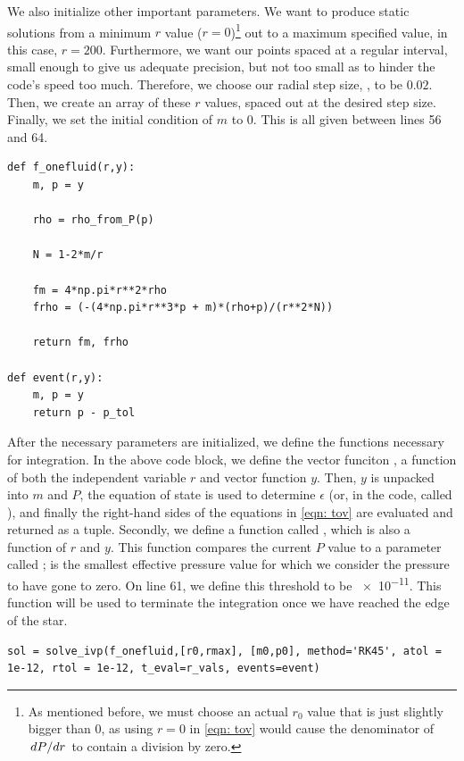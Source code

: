 We also initialize other important parameters. We want to produce static solutions from a minimum $r$ value ($r=0$)\footnote{As mentioned before, we must choose an actual $r_0$ value that is just slightly bigger than 0, as using $r=0$ in \eqref{eqn: tov} would cause the denominator of $\dv*{P}{r}$ to contain a division by zero.} out to a maximum specified value, in this case, $r=200$. Furthermore, we want our points spaced at a regular interval, small enough to give us adequate precision, but not too small as to hinder the code's speed too much. Therefore, we choose our radial step size, , to be $0.02$. Then, we create an array of these $r$ values, spaced out at the desired step size. Finally, we set the initial condition of $m$ to 0. This is all given between lines 56 and 64.

\begin{lstlisting}
def f_onefluid(r,y):
    m, p = y

    rho = rho_from_P(p)

    N = 1-2*m/r

    fm = 4*np.pi*r**2*rho
    frho = (-(4*np.pi*r**3*p + m)*(rho+p)/(r**2*N))

    return fm, frho

def event(r,y):
    m, p = y
    return p - p_tol
\end{lstlisting}

After the necessary parameters are initialized, we define the functions necessary for integration. In the above code block, we define the vector funciton , a function of both the independent variable $r$ and vector function $y$. Then, $y$ is unpacked into $m$ and $P$, the equation of state is used to determine $\epsilon$ (or, in the code, called ), and finally the right-hand sides of the equations in \eqref{eqn: tov} are evaluated and returned as a tuple. Secondly, we define a function called , which is also a function of $r$ and $y$. This function compares the current $P$ value to a parameter called ;  is the smallest effective pressure value for which we consider the pressure to have gone to zero. On line 61, we define this threshold to be \SI{e-11}{}. This function will be used to terminate the integration once we have reached the edge of the star.

\begin{lstlisting}
sol = solve_ivp(f_onefluid,[r0,rmax], [m0,p0], method='RK45', atol = 1e-12, rtol = 1e-12, t_eval=r_vals, events=event)
\end{lstlisting}

